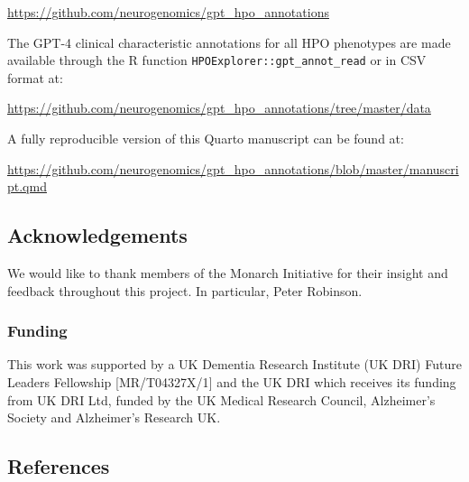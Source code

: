 \documentclass[
]{agujournal2019}
\begin{document}
\url{https://github.com/neurogenomics/gpt_hpo_annotations}

The GPT-4 clinical characteristic annotations for all HPO phenotypes are
made available through the R function
\texttt{HPOExplorer::gpt\_annot\_read} or in CSV format at:

\url{https://github.com/neurogenomics/gpt_hpo_annotations/tree/master/data}

A fully reproducible version of this Quarto manuscript can be found at:

\url{https://github.com/neurogenomics/gpt_hpo_annotations/blob/master/manuscript.qmd}

\subsection{Acknowledgements}\label{acknowledgements}

We would like to thank members of the Monarch Initiative for their
insight and feedback throughout this project. In particular, Peter
Robinson.

\subsubsection{Funding}\label{funding}

This work was supported by a UK Dementia Research Institute (UK DRI)
Future Leaders Fellowship {[}MR/T04327X/1{]} and the UK DRI which
receives its funding from UK DRI Ltd, funded by the UK Medical Research
Council, Alzheimer's Society and Alzheimer's Research UK.

\subsection*{References}\label{references}
\end{document}
